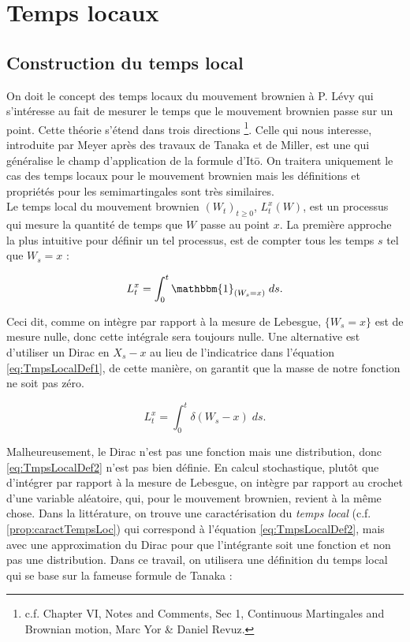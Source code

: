 \documentclass[openany]{book}
\newcommand{\1}{\mathbbm{1}}
\theoremstyle{thmfont}
\theoremstyle{deffont}
\theoremstyle{thmfont}
\theoremstyle{deffont}
\begin{document}
\chapter{Temps locaux}

\section{Construction du temps local}\label{sec:ConstrTempsLoc}

On doit le concept des temps locaux du mouvement brownien à P. Lévy qui s’intéresse au fait de mesurer le temps que le mouvement brownien passe sur un point. Cette théorie s'étend dans trois directions
\footnote{c.f. Chapter VI, Notes and Comments, Sec 1, Continuous Martingales and Brownian motion, Marc Yor \& Daniel Revuz.}.
Celle qui nous interesse, introduite par Meyer après des travaux de Tanaka et de Miller, est une qui généralise le champ d'application de la formule d'Itō. On traitera uniquement le cas des temps locaux pour le mouvement brownien mais les définitions et propriétés pour les semimartingales sont très similaires.\\

Le temps local du mouvement brownien $(W_t)_{t\geq0}$, $L_t^x(W)$, est un processus qui mesure la quantité de temps que $W$ passe au point $x$.
La première approche la plus intuitive pour définir un tel processus, est de compter tous les temps $s$ tel que $W_s = x$ :

\begin{equation}
  \label{eq:TmpsLocalDef1}
   L^x_t= \int_0^t\1_{(W_s=x)}\;ds.
  \end{equation}

  Ceci dit, comme on intègre par rapport à la mesure de Lebesgue, $\{W_s = x\}$ est de mesure nulle, donc cette intégrale sera toujours nulle. Une alternative est d'utiliser un Dirac en $X_s - x$ au lieu de l'indicatrice dans l'équation \eqref{eq:TmpsLocalDef1}, de cette manière, on garantit que la masse de notre fonction ne soit pas zéro.

\begin{equation}
  \label{eq:TmpsLocalDef2}
  L^x_t= \int_0^t\delta(W_s-x)\; ds.
\end{equation}

Malheureusement, le Dirac n'est pas une fonction mais une distribution, donc \eqref{eq:TmpsLocalDef2} n'est pas bien définie. En calcul stochastique, plutôt que d'intégrer par rapport à la mesure de Lebesgue, on intègre par rapport au crochet d'une variable aléatoire, qui, pour le mouvement brownien, revient à la même chose. Dans la littérature, on trouve une caractérisation du \textit{temps local} (c.f. \autoref{prop:caractTempsLoc}) qui correspond à l'équation \eqref{eq:TmpsLocalDef2}, mais avec une approximation du Dirac pour que l'intégrante soit une fonction et non pas une distribution. Dans ce travail, on utilisera une définition du temps local qui se base sur la fameuse formule de Tanaka :\\
\end{document}
